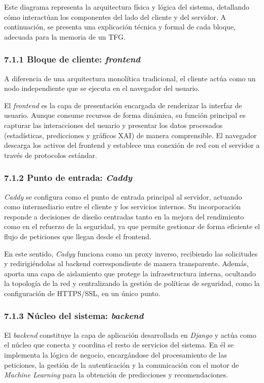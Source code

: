 Este diagrama representa la arquitectura física y lógica del sistema, detallando
cómo interactúan los componentes del lado del cliente y del servidor. A
continuación, se presenta una explicación técnica y formal de cada bloque,
adecuada para la memoria de un TFG.
 
\subsubsection{7.1.1 Bloque de cliente: \textit{frontend}}
 
A diferencia de una arquitectura monolítica tradicional, el cliente actúa como
un nodo independiente que se ejecuta en el navegador del usuario.
 
El \textit{frontend} es la capa de presentación encargada de renderizar la interfaz de
usuario. Aunque consume recursos de forma dinámica, su función principal es
capturar las interacciones del usuario y presentar los datos procesados
(estadísticas, predicciones y gráficos XAI) de manera comprensible. El
navegador descarga los activos del frontend y establece una conexión de red con
el servidor a través de protocolos estándar.
 
\subsubsection{7.1.2 Punto de entrada: \textit{Caddy}}
 
\textit{Caddy} se configura como el punto de entrada principal al servidor, actuando como intermediario
entre el cliente y los servicios internos. Su incorporación responde a decisiones de diseño
centradas tanto en la mejora del rendimiento como en el refuerzo de la seguridad, ya que permite
gestionar de forma eficiente el flujo de peticiones que llegan desde el frontend.
 
En este sentido, \textit{Cadyy} funciona como un proxy inverso, recibiendo las solicitudes y
redirigiéndolas al backend correspondiente de manera transparente. Además, aporta una capa
de aislamiento que protege la infraestructura interna, ocultando la topología de la red y
centralizando la gestión de políticas de seguridad, como la configuración de HTTPS/SSL,
en un único punto.
 
\subsubsection{7.1.3 Núcleo del sistema: \textit{backend}}
El \textit{backend} constituye la capa de aplicación desarrollada en \textit{Django} y actúa como el núcleo que
conecta y coordina el resto de servicios del sistema. En él se implementa la lógica de negocio,
encargándose del procesamiento de las peticiones, la gestión de la autenticación
y la comunicación con el motor de \textit{Machine Learning} para la obtención de predicciones y recomendaciones.
 
